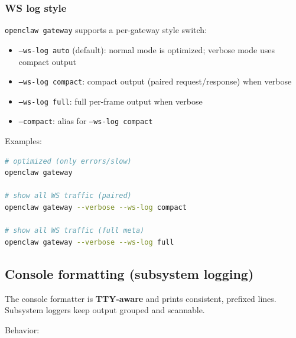 \subsubsection{WS log style}


\texttt{openclaw gateway} supports a per-gateway style switch:

\begin{itemize}
  \item \texttt{--ws-log auto} (default): normal mode is optimized; verbose mode uses compact output
  \item \texttt{--ws-log compact}: compact output (paired request/response) when verbose
  \item \texttt{--ws-log full}: full per-frame output when verbose
  \item \texttt{--compact}: alias for \texttt{--ws-log compact}
\end{itemize}


Examples:

\begin{lstlisting}[language=bash]
# optimized (only errors/slow)
openclaw gateway

# show all WS traffic (paired)
openclaw gateway --verbose --ws-log compact

# show all WS traffic (full meta)
openclaw gateway --verbose --ws-log full
\end{lstlisting}


\subsection{Console formatting (subsystem logging)}


The console formatter is \textbf{TTY-aware} and prints consistent, prefixed lines.
Subsystem loggers keep output grouped and scannable.

Behavior:

